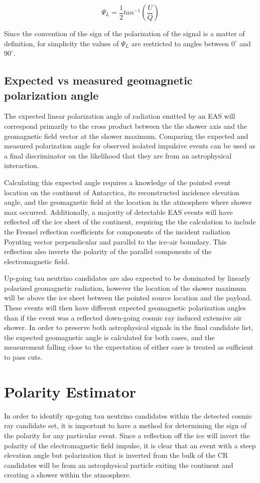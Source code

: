 	\begin{equation}
		\Psi_{L} = \frac{1}{2}tan^{-1}(\frac{U}{Q})
	\label{eqn:polAngle}
	\end{equation}
		
		Since the convention of the sign of the polarization of the signal is a matter of definition, for simplicity the values of $\Psi_{L}$ are restricted to angles between $0^\circ$ and $90^\circ$.
		
	\subsection{Expected vs measured geomagnetic polarization angle}
		The expected linear polarization angle of radiation emitted by an EAS will correspond primarily to the cross product between the the shower axis and the geomagnetic field vector at the shower maximum.  Comparing the expected and measured polarization angle for observed isolated impulsive events can be used as a final discriminator on the likelihood that they are from an astrophysical interaction.  
		
		Calculating this expected angle requires a knowledge of the pointed event location on the continent of Antarctica, its reconstructed incidence elevation angle, and the geomagnetic field at the location in the atmosphere where shower max occurred.  Additionally, a majority of detectable EAS events will have reflected off the ice sheet of the continent, requiring the the calculation to include the Fresnel reflection coefficients for components of the incident radiation Poynting vector perpendicular and parallel to the ice-air boundary.  This reflection also inverts the polarity of the parallel components of the electromagnetic field.
		
		Up-going tau neutrino candidates are also expected to be dominated by linearly polarized geomagnetic radiation, however the location of the shower maximum will be above the ice sheet between the pointed source location and the payload.  These events will then have different expected geomagnetic polarization angles than if the event was a reflected down-going cosmic ray induced extensive air shower.  In order to preserve both astrophysical signals in the final candidate list, the expected geomagnetic angle is calculated for both cases, and the measurement falling close to the expectation of either case is treated as sufficient to pass cuts.
		
		
\section{Polarity Estimator}
	In order to identify up-going tau neutrino candidates within the detected cosmic ray candidate set, it is important to have a method for determining the sign of the polarity for any particular event.  Since a reflection off the ice will invert the polarity of the electromagnetic field impulse, it is clear that an event with a steep elevation angle but polarization that is inverted from the bulk of the CR candidates will be from an astrophysical particle exiting the continent and creating a shower within the atmosphere.
	
